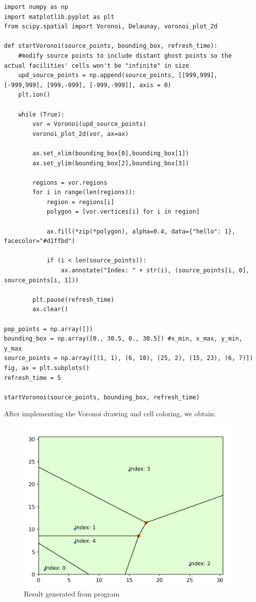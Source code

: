 \documentclass{article}
\begin{document}
\begin{verbatim} 
import numpy as np
import matplotlib.pyplot as plt 
from scipy.spatial import Voronoi, Delaunay, voronoi_plot_2d

def startVoronoi(source_points, bounding_box, refresh_time):
    #modify source points to include distant ghost points so the actual facilities' cells won't be "infinite" in size
    upd_source_points = np.append(source_points, [[999,999], [-999,999], [999,-999], [-999,-999]], axis = 0)
    plt.ion()
    
    while (True):
        vor = Voronoi(upd_source_points)
        voronoi_plot_2d(vor, ax=ax)
        
        ax.set_xlim(bounding_box[0],bounding_box[1]) 
        ax.set_ylim(bounding_box[2],bounding_box[3])
        
        regions = vor.regions
        for i in range(len(regions)):
            region = regions[i]
            polygon = [vor.vertices[i] for i in region]
            
            ax.fill(*zip(*polygon), alpha=0.4, data={"hello": 1}, facecolor="#d1ffbd")

            if (i < len(source_points)):
                ax.annotate("Index: " + str(i), (source_points[i, 0], source_points[i, 1]))
        
        plt.pause(refresh_time)
        ax.clear()
        
pop_points = np.array([])
bounding_box = np.array([0., 30.5, 0., 30.5]) #x_min, x_max, y_min, y_max
source_points = np.array([(1, 1), (6, 10), (25, 2), (15, 23), (6, 7)])
fig, ax = plt.subplots()
refresh_time = 5

startVoronoi(source_points, bounding_box, refresh_time)
\end{verbatim}

After implementing the Voronoi drawing and cell coloring, we obtain:

\begin{figure}[H]
    \centering
    \captionsetup{justification=centering}
    \includegraphics[clip,scale=0.20]{voronoi_draw_demo.png}
    \caption{Result generated from program}
    \label{fig:mid-interface}
\end{figure}
\end{document}
